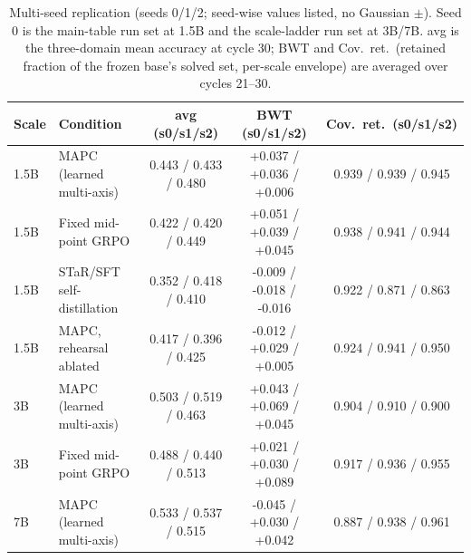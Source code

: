 \begin{table}[t]
\caption{Multi-seed replication (seeds 0/1/2; seed-wise values listed, no Gaussian
$\pm$). Seed 0 is the main-table run set at 1.5B and the scale-ladder run set at 3B/7B.
avg is the three-domain mean accuracy at cycle 30; BWT and Cov.\ ret.\ (retained fraction of
the frozen base's solved set, per-scale envelope) are averaged over cycles 21--30.}
\label{tab:seeds}
\centering\small
\begin{tabular}{@{}llccc@{}}
\toprule
Scale & Condition & avg (s0/s1/s2) & BWT (s0/s1/s2) & Cov.\ ret.\ (s0/s1/s2) \\
\midrule
1.5B & MAPC (learned multi-axis) & 0.443 / 0.433 / 0.480 & +0.037 / +0.036 / +0.006 & 0.939 / 0.939 / 0.945 \\
1.5B & Fixed mid-point GRPO & 0.422 / 0.420 / 0.449 & +0.051 / +0.039 / +0.045 & 0.938 / 0.941 / 0.944 \\
1.5B & STaR/SFT self-distillation & 0.352 / 0.418 / 0.410 & -0.009 / -0.018 / -0.016 & 0.922 / 0.871 / 0.863 \\
1.5B & MAPC, rehearsal ablated & 0.417 / 0.396 / 0.425 & -0.012 / +0.029 / +0.005 & 0.924 / 0.941 / 0.950 \\
3B & MAPC (learned multi-axis) & 0.503 / 0.519 / 0.463 & +0.043 / +0.069 / +0.045 & 0.904 / 0.910 / 0.900 \\
3B & Fixed mid-point GRPO & 0.488 / 0.440 / 0.513 & +0.021 / +0.030 / +0.089 & 0.917 / 0.936 / 0.955 \\
7B & MAPC (learned multi-axis) & 0.533 / 0.537 / 0.515 & -0.045 / +0.030 / +0.042 & 0.887 / 0.938 / 0.961 \\
\bottomrule
\end{tabular}
\end{table}
